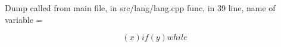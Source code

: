 \documentclass{article}
\begin{document}
Dump called from main file, in src/lang/lang.cpp func, in 39 line, name of variable = 


$$
(x) if (y) while 
$$
\end{document}
